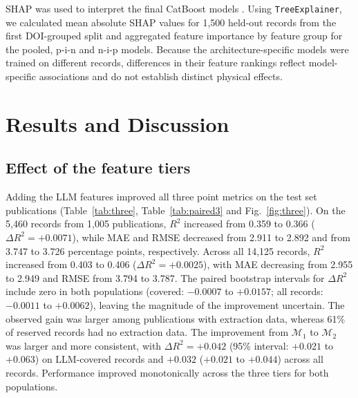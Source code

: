 \documentclass[3p]{elsarticle}
\begin{document}
SHAP was used to interpret the final CatBoost models \cite{shappaper}. Using \texttt{TreeExplainer}, we calculated mean absolute SHAP values for 1,500 held-out records from the first DOI-grouped split and aggregated feature importance by feature group for the pooled, p-i-n and n-i-p models. Because the architecture-specific models were trained on different records, differences in their feature rankings reflect model-specific associations and do not establish distinct physical effects.

\section{Results and Discussion}

\subsection{Effect of the feature tiers}
\label{sec:three}

Adding the LLM features improved all three point metrics on the test set publications (Table~\ref{tab:three}, Table~\ref{tab:paired3} and Fig.~\ref{fig:three}). On the 5,460 records from 1,005 publications, $R^2$ increased from 0.359 to 0.366 ($\Delta R^2=+0.0071$), while MAE and RMSE decreased from 2.911 to 2.892 and from 3.747 to 3.726 percentage points, respectively. Across all 14,125 records, $R^2$ increased from 0.403 to 0.406 ($\Delta R^2=+0.0025$), with MAE decreasing from 2.955 to 2.949 and RMSE from 3.794 to 3.787. The paired bootstrap intervals for $\Delta R^2$ include zero in both populations (covered: $-0.0007$ to $+0.0157$; all records: $-0.0011$ to $+0.0062$), leaving the magnitude of the improvement uncertain. The observed gain was larger among publications with extraction data, whereas 61\% of reserved records had no extraction data. The improvement from $\mathcal{M}_1$ to $\mathcal{M}_2$ was larger and more consistent, with $\Delta R^2=+0.042$ (95\% interval: $+0.021$ to $+0.063$) on LLM-covered records and $+0.032$ ($+0.021$ to $+0.044$) across all records. Performance improved monotonically across the three tiers for both populations.
\end{document}
